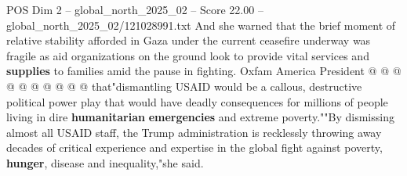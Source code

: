 \begin{textsample}{POS Dim 2 – global\_north\_2025\_02 – Score 22.00 – global\_north\_2025\_02/121028991.txt}
And she warned that the brief moment of relative stability afforded in Gaza under the current ceasefire underway was fragile as aid organizations on the ground look to provide vital services and \textbf{supplies} to families amid the pause in fighting.
Oxfam America President @ @ @ @ @ @ @ @ @ @ that"dismantling USAID would be a callous, destructive political power play that would have deadly consequences for millions of people living in dire \textbf{humanitarian} \textbf{emergencies} and extreme poverty.""By dismissing almost all USAID staff, the Trump administration is recklessly throwing away decades of critical experience and expertise in the global fight against poverty, \textbf{hunger}, disease and inequality,"she said.

\end{textsample}
